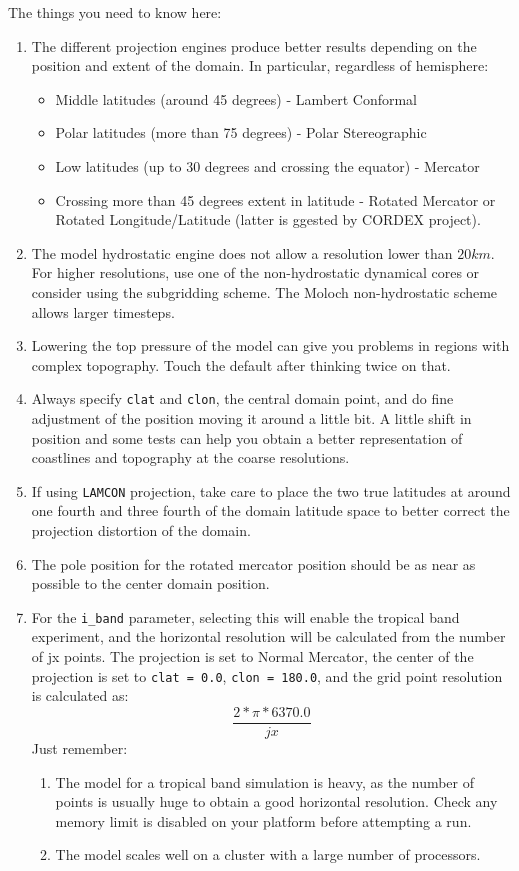 The things you need to know here:

\begin{enumerate}
\item The different projection engines produce better results depending on the
position and extent of the domain. In particular, regardless of hemisphere:
\begin{itemize}
\item Middle latitudes (around 45 degrees) - Lambert Conformal
\item Polar latitudes (more than 75 degrees) - Polar Stereographic
\item Low latitudes (up to 30 degrees and crossing the equator) - Mercator
\item Crossing more than 45 degrees extent in latitude - Rotated Mercator or Rotated Longitude/Latitude (latter is ggested by CORDEX project).
\end{itemize}
\item The model hydrostatic engine does not allow a resolution lower than
$20 km$. For higher resolutions, use one of the non-hydrostatic dynamical cores
or consider using the subgridding scheme. The Moloch non-hydrostatic scheme
allows larger timesteps.
\item Lowering the top pressure of the model can give you problems in regions
with complex topography. Touch the default after thinking twice on that.
\item Always specify \verb=clat= and \verb=clon=, the central domain point,
and do fine adjustment of the position moving it around a little bit. A
little shift in position and some tests can help you obtain a better
representation of coastlines and topography at the coarse resolutions.
\item If using \verb=LAMCON= projection, take care to place the two
true latitudes at around one fourth and three fourth of the domain latitude
space to better correct the projection distortion of the domain.
\item The pole position for the rotated mercator position should be as near as
possible to the center domain position.
\item For the \verb=i_band= parameter, selecting this will enable the tropical
band experiment, and the horizontal resolution will be calculated from the
number of jx points.
The projection is set to Normal Mercator, the center of the projection is set
to \verb'clat = 0.0', \verb'clon = 180.0',
and the grid point resolution is calculated as:
\begin{equation}
\frac{2*\pi*6370.0}{jx}
\end{equation}
Just remember:
\begin{enumerate}
\item The model for a tropical band simulation is heavy, as the number of points
is usually huge to obtain a good horizontal resolution. Check any memory
limit is disabled on your platform before attempting a run.
\item The model scales well on a cluster with a large number of processors.
\end{enumerate}

\end{enumerate}

